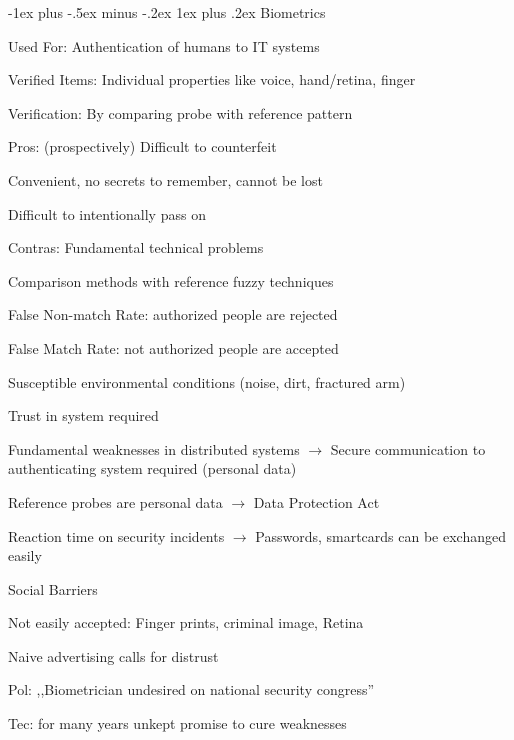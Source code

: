 \documentclass[a4paper]{article}
\makeatletter
\renewcommand{\subsubsection}{\@startsection{subsubsection}{3}{0mm}%
                {-1ex plus -.5ex minus -.2ex}%
                {1ex plus .2ex}%
                {\normalfont\small\bfseries}}
\makeatother
\begin{document}
\begin{multicols}{3}
    \subsubsection{Biometrics}
    \begin{itemize*}
        \item Used For: Authentication of humans to IT systems
        \item Verified Items: Individual properties like voice, hand/retina, finger
        \item Verification: By comparing probe with reference pattern
        \item Pros: (prospectively) Difficult to counterfeit
        \begin{itemize*}
            \item Convenient, no secrets to remember, cannot be lost
            \item Difficult to intentionally pass on
        \end{itemize*}
        \item Contras: Fundamental technical problems
        \begin{itemize*}
            \item Comparison methods with reference fuzzy techniques
            \item False Non-match Rate: authorized people are rejected
            \item False Match Rate: not authorized people are accepted
            \item Susceptible environmental conditions (noise, dirt, fractured arm)
        \end{itemize*}
        \item Trust in system required
        \item Fundamental weaknesses in distributed systems $\rightarrow$ Secure communication to authenticating system required (personal data)
        \item Reference probes are personal data $\rightarrow$ Data Protection Act
        \item Reaction time on security incidents $\rightarrow$ Passwords, smartcards can be exchanged easily
    \end{itemize*}

    Social Barriers
    \begin{itemize*}
        \item Not easily accepted: Finger prints, criminal image, Retina
        \item Naive advertising calls for distrust
        \begin{itemize*}
            \item Pol: ,,Biometrician undesired on national security congress''
            \item Tec: for many years unkept promise to cure weaknesses
        \end{itemize*}
    \end{itemize*}


\end{multicols}
\end{document}
